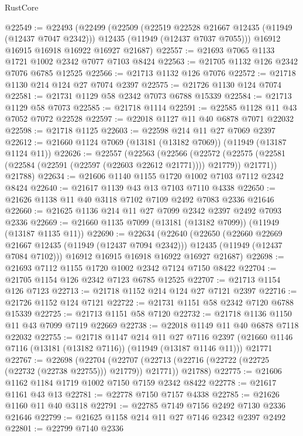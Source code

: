 \begin{lexlean}{RustCore}
\begin{coremodule}
@22549 := @22493
    (@22499
      (@22509
        (@22519 @22528 @21667 @12435 (@11949 (@12437 @7047 @2342)))
        @12435
        (@11949 (@12437 @7037 @7055)))
      @16912
      @16915
      @16918
      @16922
      @16927
      @21687)
@22557 := @21693 @7065 @1133 @1721 @1002 @2342 @7077 @7103 @8424
@22563 := @21705 @1132 @126 @2342 @7076 @6785 @12525
@22566 := @21713 @1132 @126 @7076
@22572 := @21718 @1130 @214 @124 @27 @7074 @2397
@22575 := @21726 @1130 @124 @7074
@22581 := @21731 @1129 @58 @2342 @7073 @6788 @15339
@22584 := @21713 @1129 @58 @7073
@22585 := @21718 @1114
@22591 := @22585 @1128 @11 @43 @7052 @7072 @22528
@22597 := @22018 @1127 @11 @40 @6878 @7071 @22032
@22598 := @21718 @1125
@22603 := @22598 @214 @11 @27 @7069 @2397
@22612 := @21660 @1124 @7069 (@13181 (@13182 @7069)) (@11949 (@13187 @1124 @11))
@22626 := @22557
    (@22563
      (@22566
        (@22572 (@22575 (@22581 (@22584 (@22591 (@22597 (@22603 @22612 @21771)))) @21779)) @21771))
      @21788)
@22634 := @21606 @1140 @1155 @1720 @1002 @7103 @7112 @2342 @8424
@22640 := @21617 @1139 @43 @13 @7103 @7110 @4338
@22650 := @21626 @1138 @11 @40 @3118 @7102 @7109 @2492 @7083 @2336 @21646
@22660 := @21625 @1136 @214 @11 @27 @7099 @2342 @2397 @2492 @7093 @2336
@22669 := @21660 @1135 @7099 (@13181 (@13182 @7099)) (@11949 (@13187 @1135 @11))
@22690 := @22634
    (@22640
      (@22650
        (@22660 @22669 @21667 @12435 (@11949 (@12437 @7094 @2342)))
        @12435
        (@11949 (@12437 @7084 @7102)))
      @16912
      @16915
      @16918
      @16922
      @16927
      @21687)
@22698 := @21693 @7112 @1155 @1720 @1002 @2342 @7124 @7150 @8422
@22704 := @21705 @1154 @126 @2342 @7123 @6785 @12525
@22707 := @21713 @1154 @126 @7123
@22713 := @21718 @1152 @214 @124 @27 @7121 @2397
@22716 := @21726 @1152 @124 @7121
@22722 := @21731 @1151 @58 @2342 @7120 @6788 @15339
@22725 := @21713 @1151 @58 @7120
@22732 := @21718 @1136 @1150 @11 @43 @7099 @7119 @22669
@22738 := @22018 @1149 @11 @40 @6878 @7118 @22032
@22755 := @21718
    @1147
    @214
    @11
    @27
    @7116
    @2397
    (@21660 @1146 @7116 (@13181 (@13182 @7116)) (@11949 (@13187 @1146 @11)))
    @21771
@22767 := @22698
    (@22704
      (@22707 (@22713 (@22716 (@22722 (@22725 (@22732 (@22738 @22755))) @21779)) @21771))
      @21788)
@22775 := @21606 @1162 @1184 @1719 @1002 @7150 @7159 @2342 @8422
@22778 := @21617 @1161 @43 @13
@22781 := @22778 @7150 @7157 @4338
@22785 := @21626 @1160 @11 @40 @3118
@22791 := @22785 @7149 @7156 @2492 @7130 @2336 @21646
@22799 := @21625 @1158 @214 @11 @27 @7146 @2342 @2397 @2492
@22801 := @22799 @7140 @2336

\end{coremodule}
\end{lexlean}
